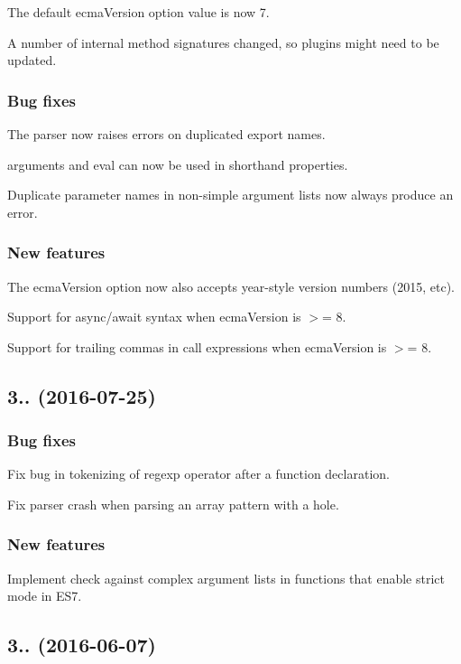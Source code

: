 The default {\ttfamily ecma\+Version} option value is now 7.

A number of internal method signatures changed, so plugins might need to be updated.

\subsubsection*{Bug fixes}

The parser now raises errors on duplicated export names.

{\ttfamily arguments} and {\ttfamily eval} can now be used in shorthand properties.

Duplicate parameter names in non-\/simple argument lists now always produce an error.

\subsubsection*{New features}

The {\ttfamily ecma\+Version} option now also accepts year-\/style version numbers (2015, etc).

Support for {\ttfamily async}/{\ttfamily await} syntax when {\ttfamily ecma\+Version} is $>$= 8.

Support for trailing commas in call expressions when {\ttfamily ecma\+Version} is $>$= 8.

\subsection*{3.. (2016-\/07-\/25)}

\subsubsection*{Bug fixes}

Fix bug in tokenizing of regexp operator after a function declaration.

Fix parser crash when parsing an array pattern with a hole.

\subsubsection*{New features}

Implement check against complex argument lists in functions that enable strict mode in E\+S7.

\subsection*{3.. (2016-\/06-\/07)}

